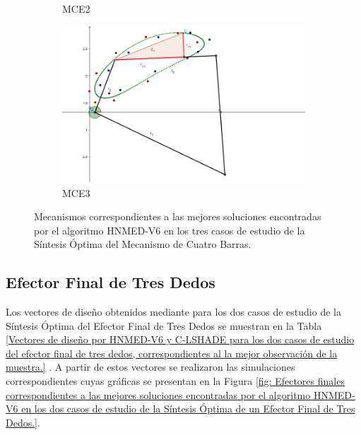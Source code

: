 \begin{figure}[h]
\begin{subfigure}[b]{0.46\linewidth}
		\caption{MCE2} \label{fig:M2} 
	\end{subfigure}
\hspace{2cm} 
	\begin{subfigure}[b]{0.46\linewidth}
		\centering
		\includegraphics[width=\linewidth]{Figures/MCE3}
		\caption{MCE3} \label{fig:M3} 
	\end{subfigure}
	
	\caption{Mecanismos correspondientes a las mejores soluciones encontradas por el algoritmo HNMED-V6 en los
		tres casos de estudio de la Síntesis Óptima del Mecanismo de Cuatro Barras.} \label{fig: Mecanismos correspondientes a las mejores soluciones encontradas por el algoritmo HNMED-V6 en los
		tres casos de estudio de la Síntesis Óptima del Mecanismo de Cuatro Barras.} 
	
\end{figure}
\newpage
					
\subsection{Efector Final de Tres Dedos}
Los vectores de diseño obtenidos mediante para los dos casos
de estudio de la Síntesis Óptima del  Efector Final de Tres Dedos se muestran en la Tabla \ref{Vectores de diseño por HNMED-V6 y C-LSHADE para los dos casos de estudio del efector final de tres dedos, correspondientes al la mejor observación de la muestra.} . A partir de estos vectores se realizaron las simulaciones correspondientes cuyas gráficas se presentan en la Figura \ref{fig: Efectores finales  correspondientes a las mejores soluciones encontradas por el algoritmo HNMED-V6 en los dos casos de estudio de la Síntesis Óptima de un Efector Final de Tres Dedos.}.

